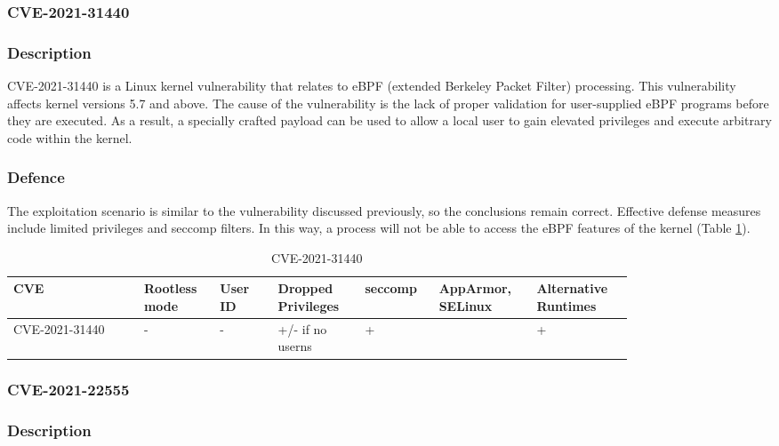 \subsubsection{CVE-2021-31440}
\subsubsection*{Description}

CVE-2021-31440 is a Linux kernel vulnerability that relates to eBPF (extended Berkeley Packet Filter) processing. This vulnerability affects kernel versions 5.7 and above. The cause of the vulnerability is the lack of proper validation for user-supplied eBPF programs before they are executed. As a result, a specially crafted payload can be used to allow a local user to gain elevated privileges and execute arbitrary code within the kernel.

\subsubsection*{Defence}

The exploitation scenario is similar to the vulnerability discussed previously, so the conclusions remain correct. Effective defense measures include limited privileges and seccomp filters. In this way, a process will not be able to access the eBPF features of the kernel (Table \ref{tab:h:5}).

\begin{table}[H]
    \centering \small
    \begin{tabular}{| p{0.18\linewidth} | p{0.1\linewidth} | p{0.08\linewidth} | p{0.12\linewidth} | p{0.09\linewidth} | p{0.12\linewidth} | p{0.12\linewidth} |} \hline
    CVE & Rootless mode & User ID & Dropped Privileges & seccomp & AppArmor, SELinux & Alternative Runtimes \\ \hline
    CVE-2021-31440 & - & - & \cellcolor{yellow!25} +/- \linebreak if no userns & \cellcolor{green!25} + &  & \cellcolor{green!25} + \\ \hline
    \end{tabular}
    \caption{CVE-2021-31440}
    \label{tab:h:5}
\end{table}




\subsubsection{CVE-2021-22555}
\subsubsection*{Description}

